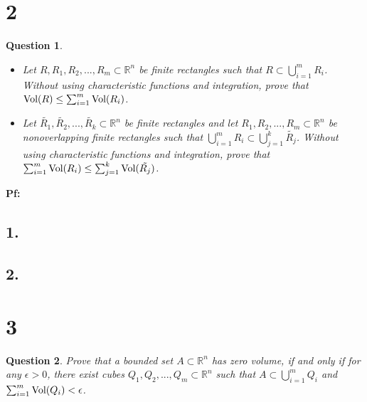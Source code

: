 \documentclass{article}
\newtheorem{question}{Question}
\begin{document}
\break

\section*{2}
\begin{myBox}[]{}
    \begin{question}

        \hfil

        \begin{itemize}
            \item[1.] Let $R,R_1,R_2,...,R_m\subset \mathbb{R}^n$ be finite rectangles such that $R\subset\bigcup_{i=1}^{m}R_i$. Without using characteristic functions and integration, prove that $\textmd{Vol}(R)\leq \sum_{i=1}^{m}\textmd{Vol}(R_i)$.
            \item[2.] Let $\tilde{R_1},\tilde{R_2},...,\tilde{R_k}\subset \mathbb{R}^n$ be finite rectangles and let $R_1,R_2,...,R_m\subset\mathbb{R}^n$ be nonoverlapping finite rectangles such that $\bigcup_{i=1}^{m}R_i\subset\bigcup_{j=1}^{k}\tilde{R_j}$. Without using characteristic functions and integration, prove that $\sum_{i=1}^{m}\textmd{Vol}(R_i)\leq\sum_{j=1}^{k}\textmd{Vol}(\tilde{R_j})$. 
        \end{itemize}
    \end{question}
\end{myBox}

\textbf{Pf:}
\subsection*{1.}

\subsection*{2.}

\break

\section*{3}
\begin{myBox}[]{}
    \begin{question}
        Prove that a bounded set $A\subset\mathbb{R}^n$ has zero volume, if and only if for any $\epsilon>0$, there exist cubes $Q_1,Q_2,...,Q_m\subset\mathbb{R}^n$ such that $A\subset\bigcup_{i=1}^{m}Q_i$ and $\sum_{i=1}^{m}\textmd{Vol}(Q_i)<\epsilon$.
    \end{question}
\end{myBox}
\end{document}
